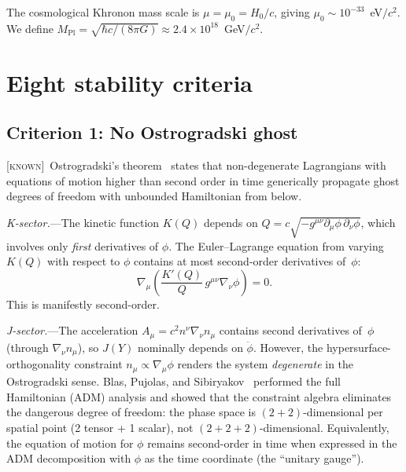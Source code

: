 \documentclass[prd,twocolumn,superscriptaddress,longbibliography,floatfix]{revtex4-2}
\newcommand{\MPl}{M_{\mathrm{Pl}}}
\newcommand{\known}{\textsc{[known]}}
\begin{document}
The cosmological Khronon mass scale is $\mu = \mu_0 = H_0/c$,
giving $\mu_0 \sim 10^{-33}$~eV$/c^2$.  We define
$\MPl = \sqrt{\hbar c / (8\pi G)} \approx 2.4 \times 10^{18}$~GeV$/c^2$.


\section{Eight stability criteria}
\label{sec:criteria}


\subsection{Criterion 1: No Ostrogradski ghost}
\label{sec:ostrogradski}

\known\ Ostrogradski's theorem~\cite{Woodard2015} states that
non-degenerate Lagrangians with equations of motion higher than
second order in time generically propagate ghost degrees of freedom
with unbounded Hamiltonian from below.

\textit{K-sector.}---The kinetic function $K(Q)$ depends on
$Q = c\sqrt{-g^{\mu\nu}\partial_\mu\phi\,\partial_\nu\phi}$, which
involves only \emph{first} derivatives of $\phi$.  The Euler--Lagrange
equation from varying $K(Q)$ with respect to $\phi$ contains at most
second-order derivatives of~$\phi$:
\begin{equation}
\nabla_\mu\!\left(\frac{K'(Q)}{Q}\,g^{\mu\nu}\nabla_\nu\phi\right) = 0.
\label{eq:EOM_K}
\end{equation}
This is manifestly second-order.  \checkmark

\textit{J-sector.}---The acceleration $A_\mu = c^2 n^\nu\nabla_\nu n_\mu$
contains second derivatives of~$\phi$ (through $\nabla_\nu n_\mu$), so
$J(Y)$ nominally depends on $\ddot\phi$.  However, the
hypersurface-orthogonality constraint $n_\mu \propto \nabla_\mu\phi$
renders the system \emph{degenerate} in the Ostrogradski sense.
Blas, Pujolas, and Sibiryakov~\cite{BPS2010} performed the full
Hamiltonian (ADM) analysis and showed that the constraint algebra
eliminates the dangerous degree of freedom: the phase space is
$(2+2)$-dimensional per spatial point (2 tensor + 1 scalar), not
$(2+2+2)$-dimensional.  Equivalently, the equation of motion for $\phi$
remains second-order in time when expressed in the ADM decomposition
with $\phi$ as the time coordinate (the ``unitary gauge'').
\end{document}
